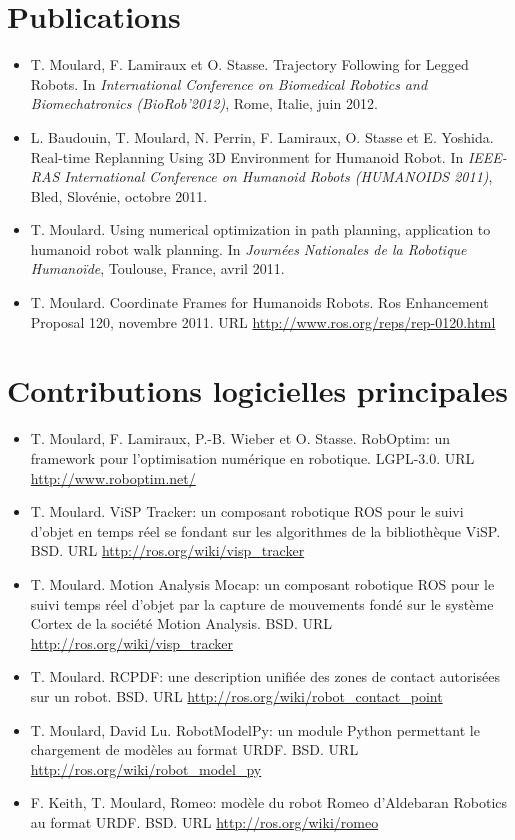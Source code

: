 \chapter*{Publications}\label{chap:publis}

\begin{itemize}
\item T. Moulard, F. Lamiraux et O. Stasse. Trajectory Following for
  Legged Robots. In \emph{International Conference on Biomedical
    Robotics and Biomechatronics (BioRob'2012)}, Rome, Italie, juin
  2012.
\item L. Baudouin, T. Moulard, N. Perrin, F. Lamiraux, O. Stasse et
  E. Yoshida. Real-time Replanning Using 3D Environment for Humanoid
  Robot. In \emph{IEEE-RAS International Conference on Humanoid Robots
    (HUMANOIDS 2011)}, Bled, Slovénie, octobre 2011.
\item T. Moulard. Using numerical optimization in path planning,
  application to humanoid robot walk planning. In \emph{Journées
    Nationales de la Robotique Humanoïde}, Toulouse, France, avril
  2011.
\item T. Moulard. Coordinate Frames for Humanoids Robots. Ros
  Enhancement Proposal 120, novembre 2011. URL
  \url{http://www.ros.org/reps/rep-0120.html}
\end{itemize}


\chapter*{Contributions logicielles principales}\label{chap:soft}

\begin{itemize}
\item T. Moulard, F. Lamiraux, P.-B. Wieber et O. Stasse. RobOptim: un
  framework pour l'optimisation numérique en robotique. LGPL-3.0. URL
  \url{http://www.roboptim.net/}
\item T. Moulard. ViSP Tracker: un composant robotique ROS pour le
  suivi d'objet en temps réel se fondant sur les algorithmes de la
  bibliothèque ViSP. BSD. URL \url{http://ros.org/wiki/visp_tracker}
\item T. Moulard. Motion Analysis Mocap: un composant robotique ROS
  pour le suivi temps réel d'objet par la capture de mouvements fondé
  sur le système Cortex de la société Motion Analysis. BSD. URL
  \url{http://ros.org/wiki/visp_tracker}
\item T. Moulard. RCPDF: une description unifiée des zones de contact
  autorisées sur un robot. BSD. URL
  \url{http://ros.org/wiki/robot_contact_point}
\item T. Moulard, David Lu. RobotModelPy: un module Python permettant
  le chargement de modèles au format URDF. BSD. URL
  \url{http://ros.org/wiki/robot_model_py}
\item F. Keith, T. Moulard, Romeo: modèle du robot Romeo d'Aldebaran
  Robotics au format URDF. BSD. URL \url{http://ros.org/wiki/romeo}
\end{itemize}
